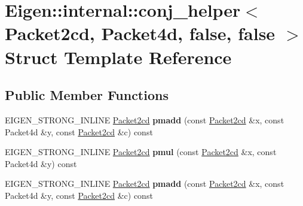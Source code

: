 \hypertarget{struct_eigen_1_1internal_1_1conj__helper_3_01_packet2cd_00_01_packet4d_00_01false_00_01false_01_4}{}\section{Eigen\+:\+:internal\+:\+:conj\+\_\+helper$<$ Packet2cd, Packet4d, false, false $>$ Struct Template Reference}
\label{struct_eigen_1_1internal_1_1conj__helper_3_01_packet2cd_00_01_packet4d_00_01false_00_01false_01_4}
\subsection*{Public Member Functions}
\begin{DoxyCompactItemize}
\item 
\mbox{\label{struct_eigen_1_1internal_1_1conj__helper_3_01_packet2cd_00_01_packet4d_00_01false_00_01false_01_4_abab98eb44eb0133d7d85080fb90e6776}} 
E\+I\+G\+E\+N\+\_\+\+S\+T\+R\+O\+N\+G\+\_\+\+I\+N\+L\+I\+NE \hyperlink{struct_eigen_1_1internal_1_1_packet2cd}{Packet2cd} {\bfseries pmadd} (const \hyperlink{struct_eigen_1_1internal_1_1_packet2cd}{Packet2cd} \&x, const Packet4d \&y, const \hyperlink{struct_eigen_1_1internal_1_1_packet2cd}{Packet2cd} \&c) const
\item 
\mbox{\label{struct_eigen_1_1internal_1_1conj__helper_3_01_packet2cd_00_01_packet4d_00_01false_00_01false_01_4_a1d58ade0366784b121425bfadd07fa17}} 
E\+I\+G\+E\+N\+\_\+\+S\+T\+R\+O\+N\+G\+\_\+\+I\+N\+L\+I\+NE \hyperlink{struct_eigen_1_1internal_1_1_packet2cd}{Packet2cd} {\bfseries pmul} (const \hyperlink{struct_eigen_1_1internal_1_1_packet2cd}{Packet2cd} \&x, const Packet4d \&y) const
\item 
\mbox{\label{struct_eigen_1_1internal_1_1conj__helper_3_01_packet2cd_00_01_packet4d_00_01false_00_01false_01_4_abab98eb44eb0133d7d85080fb90e6776}} 
E\+I\+G\+E\+N\+\_\+\+S\+T\+R\+O\+N\+G\+\_\+\+I\+N\+L\+I\+NE \hyperlink{struct_eigen_1_1internal_1_1_packet2cd}{Packet2cd} {\bfseries pmadd} (const \hyperlink{struct_eigen_1_1internal_1_1_packet2cd}{Packet2cd} \&x, const Packet4d \&y, const \hyperlink{struct_eigen_1_1internal_1_1_packet2cd}{Packet2cd} \&c) const

\end{DoxyCompactItemize}

